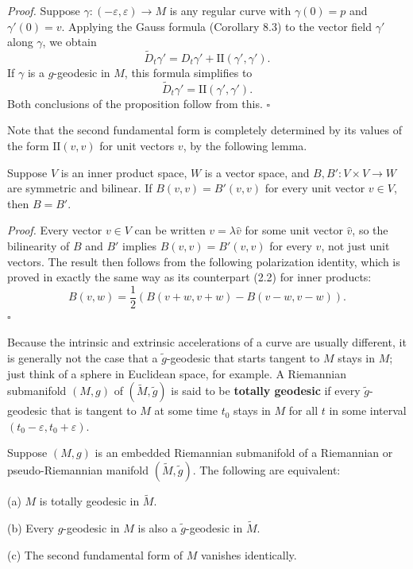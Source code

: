 \emph{Proof.} Suppose $\gamma: (-\varepsilon,\varepsilon) \to M$ is any regular curve with $\gamma(0) = p$ and $\gamma'(0) = v$. Applying the Gauss formula (Corollary 8.3) to the vector field $\gamma'$ along $\gamma$, we obtain
\[
\tilde{D}_t \gamma' = D_t \gamma' + \text{II}(\gamma', \gamma').
\]
If $\gamma$ is a $g$-geodesic in $M$, this formula simplifies to
\[
\tilde{D}_t \gamma' = \text{II}(\gamma', \gamma').
\]
Both conclusions of the proposition follow from this. $\square$

Note that the second fundamental form is completely determined by its values of the form $\text{II}(v,v)$ for unit vectors $v$, by the following lemma.

\begin{lemma}
\label{lem:symmetric-bilinear-form-unit-vectors}
Suppose $V$ is an inner product space, $W$ is a vector space, and $B, B': V \times V \to W$ are symmetric and bilinear. If $B(v,v) = B'(v,v)$ for every unit vector $v \in V$, then $B = B'$.
\end{lemma}

\emph{Proof.} Every vector $v \in V$ can be written $v = \lambda \hat{v}$ for some unit vector $\hat{v}$, so the bilinearity of $B$ and $B'$ implies $B(v,v) = B'(v,v)$ for every $v$, not just unit vectors. The result then follows from the following polarization identity, which is proved in exactly the same way as its counterpart (2.2) for inner products:
\[
B(v,w) = \frac{1}{2}\left(B(v+w, v+w) - B(v-w, v-w)\right).
\]
$\square$

Because the intrinsic and extrinsic accelerations of a curve are usually different, it is generally not the case that a $\tilde{g}$-geodesic that starts tangent to $M$ stays in $M$; just think of a sphere in Euclidean space, for example. A Riemannian submanifold $(M, g)$ of $(\tilde{M}, \tilde{g})$ is said to be \textbf{totally geodesic} if every $\tilde{g}$-geodesic that is tangent to $M$ at some time $t_0$ stays in $M$ for all $t$ in some interval $(t_0 - \varepsilon, t_0 + \varepsilon)$.

\begin{proposition}
\label{prop:totally-geodesic-equivalence}

Suppose $(M, g)$ is an embedded Riemannian submanifold of a Riemannian or pseudo-Riemannian manifold $(\tilde{M}, \tilde{g})$. The following are equivalent:

(a) $M$ is totally geodesic in $\tilde{M}$.

(b) Every $g$-geodesic in $M$ is also a $\tilde{g}$-geodesic in $\tilde{M}$.

(c) The second fundamental form of $M$ vanishes identically.
\end{proposition}

